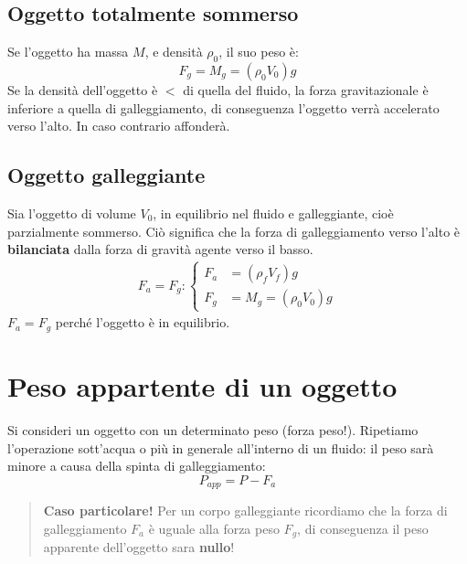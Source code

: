         \subsection{Oggetto totalmente sommerso} Se l'oggetto ha massa $M$, e
        densità $\rho_0$, il suo peso è:
            \begin{equation}
                F_g = M_g = (\rho_0 V_0) g
            \end{equation}
        Se la densità dell'oggetto è $<$ di quella del fluido, la forza 
        gravitazionale è inferiore a quella di galleggiamento, di conseguenza
        l'oggetto verrà accelerato verso l'alto. In caso contrario affonderà.

        \subsection{Oggetto galleggiante} Sia l'oggetto di volume $V_0$, in 
        equilibrio nel fluido e galleggiante, cioè parzialmente sommerso. Ciò
        significa che la forza di galleggiamento verso l'alto è 
        \textbf{bilanciata} dalla forza di gravità agente verso il basso.
            \begin{align}
                F_a = F_g :
                \begin{cases}
                    F_a &= (\rho_f V_f)g \\
                    F_g &= M_g = (\rho_0 V_0)g
                \end{cases}
            \end{align}
        $F_a = F_g$ perché l'oggetto è in equilibrio.

    \section{Peso appartente di un oggetto} Si consideri un oggetto con un 
    determinato peso (forza peso!). Ripetiamo l'operazione sott'acqua o più in 
    generale all'interno di un fluido: il peso sarà minore a causa della spinta
    di galleggiamento:
        \begin{equation}
            P_{app} = P - F_a
        \end{equation}
        \begin{quote}
            \textbf{Caso particolare!} Per un corpo galleggiante ricordiamo che
            la forza di galleggiamento $F_a$ è uguale alla forza peso $F_g$, di
            conseguenza il peso apparente dell'oggetto sara \textbf{nullo}!
        \end{quote}
            